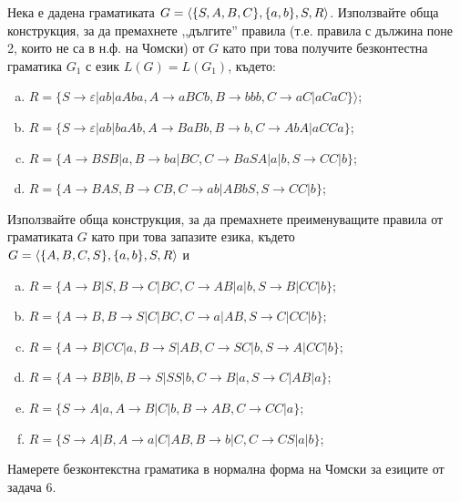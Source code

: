 \begin{problem}
  Нека е дадена граматиката  $G = \langle{\{S,A,B,C\}, \{a,b\}, S, R}\rangle$.
  Използвайте обща конструкция, за да премахнете ,,дългите'' правила 
  (т.е. правила с дължина поне 2, които не са в н.ф. на Чомски) от $ G$ като при това получите 
  безконтестна граматика $G_1$ с език $L(G)=L(G_1)$, където:
  \begin{enumerate}[a)]
  \item
    $R = \{S \rightarrow \varepsilon|ab|aAba, A\rightarrow aBCb, B\rightarrow bbb, C\rightarrow aC\vert aCaC\}\rangle$;
  \item
    $R = \{S \rightarrow \varepsilon|ab|baAb, A\rightarrow BaBb,B\rightarrow b,C\rightarrow AbA\vert aCCa\}$;
  \item
    $R = \{A\rightarrow BSB|a,B\rightarrow ba|BC,C\rightarrow BaSA|a|b,S\rightarrow CC|b\}$;
  \item
    $R = \{A\rightarrow BAS,B\rightarrow CB,C\rightarrow ab|ABbS,S\rightarrow CC|b\}$;
  \end{enumerate}
\end{problem}

\begin{problem}
  Използвайте обща конструкция, за да премахнете преименуващите правила от граматиката $G$ като при това запазите езика,
  където $G = \langle{\{A,B,C,S\},\{a,b\}, S, R}\rangle$ и
  \begin{enumerate}[a)]
  \item
    $R = \{A\rightarrow B|S,B\rightarrow C|BC,C\rightarrow AB|a|b,S\rightarrow B|CC|b\}$;
  \item
    $R = \{A\rightarrow B,B\rightarrow S|C|BC,C\rightarrow a|AB,S\rightarrow C|CC|b\}$;
  \item
    $R = \{A\rightarrow B|CC|a,B\rightarrow S|AB,C\rightarrow SC|b,S\rightarrow A|CC|b\}$;
  \item
    $R = \{A\rightarrow BB|b,B\rightarrow S|SS|b,C\rightarrow B|a,S\rightarrow C|AB|a\}$;
  \item
    $R = \{S\rightarrow A|a,A\rightarrow B|C|b, B\rightarrow AB, C\rightarrow CC|a\}$;
  \item
    $R = \{S\rightarrow A|B, A\rightarrow a|C|AB, B\rightarrow b|C, C\rightarrow CS|a|b\}$;
  \end{enumerate}
\end{problem}

\begin{problem}
  Намерете безконтекстна граматика в нормална форма на Чомски за езиците от задача 6.
\end{problem}


